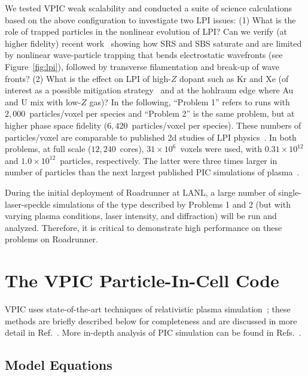 \documentclass[journal,twoside]{IEEEtran}
\newcommand{\fig}[1]{Figure~\ref{fig:#1}}
\begin{document}
We tested VPIC weak scalability and conducted a suite of science
calculations~\cite{AAC_Conference_Paper} based on the above
configuration to investigate two LPI issues: (1) What is the role
of trapped particles in the nonlinear evolution of LPI?  Can we verify
(at higher fidelity) recent
work~\cite{Yin_et_al_PRL_2007_SRS,Yin_et_al_Phys_Plasmas_2007_SRS}
showing how SRS and SBS saturate and are limited by nonlinear
wave-particle trapping that bends electrostatic wavefronts (see
\fig{lpi}), followed by transverse filamentation and break-up
of wave fronts?  (2) What is the effect on LPI of high-$Z$ dopant such
as Kr and Xe (of interest as a possible mitigation
strategy~\cite{Lushnikov_PPCF_2006} and at the hohlraum edge where Au
and U mix with low-$Z$ gas)?  In the following, ``Problem 1'' refers
to runs with $2,000$~particles/voxel per species and ``Problem 2'' is
the same problem, but at higher phase space fidelity
($6,420$~particles/voxel per species).  These numbers of
particles/voxel are comparable to published 2d studies of LPI
physics~\cite{Yin_et_al_PRL_2007_SRS,Yin_et_al_Phys_Plasmas_2007_SRS}.
In both problems, at full scale ($12,240$~cores), $31 \times
10^6$~voxels were used, with $0.31 \times 10^{12}$ and $1.0 \times
10^{12}$~particles, respectively.  The latter were three times larger
in number of particles than the next largest published PIC simulations
of plasma~\cite{Yin_et_al_PRL_2007_reconnection}.

During the initial deployment of Roadrunner at LANL, a large number of
single-laser-speckle simulations of the type described by Problems 1
and 2 (but with varying plasma conditions, laser intensity, and
diffraction) will be run and analyzed.  Therefore, it is critical to
demonstrate high performance on these problems on Roadrunner.

\section{The VPIC Particle-In-Cell Code}

VPIC uses state-of-the-art techniques of relativistic plasma
simulation~\cite{Blahovec_et_al_2000,Eastwood_et_al_1995,
Jones_et_al_1996,Kwan_Snell_1985,Nieter_Cary_2004,
Verboncoeur_et_al_1995}; these methods are briefly described below for
completeness and are discussed in more detail in
Ref.~\cite{Bowers_et_al_Phys_Plasmas_2007}.  More in-depth analysis of
PIC simulation can be found in
Refs.~\cite{Birdsall_Langdon_1985,Hockney_Eastwood_1988}.

\subsection{Model Equations}
\end{document}
